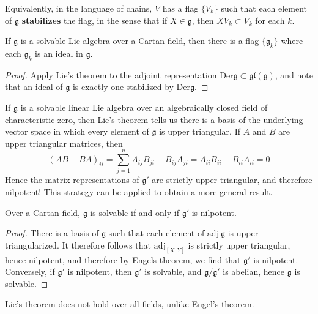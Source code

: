 Equivalently, in the language of chains, $V$ has a flag $\{ V_k \}$ such that each element of $\mathfrak{g}$ {\bf stabilizes} the flag, in the sense that if $X \in \mathfrak{g}$, then $XV_k \subset V_k$ for each $k$.

\begin{corollary}
    If $\mathfrak{g}$ is a solvable Lie algebra over a Cartan field, then there is a flag $\{ \mathfrak{g}_k \}$ where each $\mathfrak{g}_k$ is an ideal in $\mathfrak{g}$.
\end{corollary}
\begin{proof}
    Apply Lie's theorem to the adjoint representation $\text{Der} \mathfrak{g} \subset \mathfrak{gl}(\mathfrak{g})$, and note that an ideal of $\mathfrak{g}$ is exactly one stabilized by $\text{Der} \mathfrak{g}$.
\end{proof}

If $\mathfrak{g}$ is a solvable linear Lie algebra over an algebraically closed field of characteristic zero, then Lie's theorem tells us there is a basis of the underlying vector space in which every element of $\mathfrak{g}$ is upper triangular. If $A$ and $B$ are upper triangular matrices, then
%
\[ (AB - BA)_{ii} = \sum_{j = 1}^n A_{ij}B_{ji} - B_{ij}A_{ji} = A_{ii}B_{ii} - B_{ii}A_{ii} = 0 \]
%
Hence the matrix representations of $\mathfrak{g}'$ are strictly upper triangular, and therefore nilpotent! This strategy can be applied to obtain a more general result.

\begin{theorem}
    Over a Cartan field, $\mathfrak{g}$ is solvable if and only if $\mathfrak{g}'$ is nilpotent.
\end{theorem}
\begin{proof}
    There is a basis of $\mathfrak{g}$ such that each element of $\text{adj}\ \mathfrak{g}$ is upper triangularized. It therefore follows that $\text{adj}_{[X,Y]}$ is strictly upper triangular, hence nilpotent, and therefore by Engels theorem, we find that $\mathfrak{g}'$ is nilpotent. Conversely, if $\mathfrak{g}'$ is nilpotent, then $\mathfrak{g}'$ is solvable, and $\mathfrak{g}/\mathfrak{g}'$ is abelian, hence $\mathfrak{g}$ is solvable.
\end{proof}

Lie's theorem does not hold over all fields, unlike Engel's theorem.

